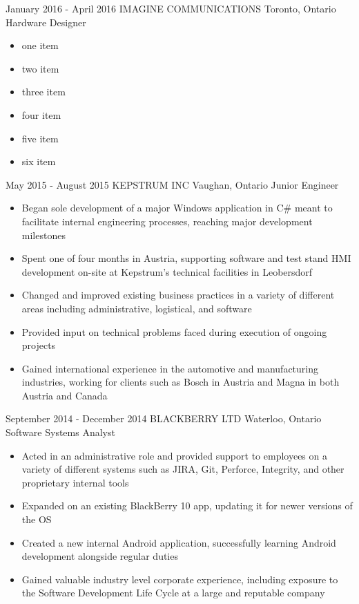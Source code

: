 \documentclass[hidelinks]{kkurucz-cv}
\begin{document}
\begin{entrylist}
\entry
{January 2016 - April 2016}
{IMAGINE COMMUNICATIONS}
{Toronto, Ontario}
{Hardware Designer}
{
\begin{itemize}
	\item one item
	\item two item
	\item three item
	\item four item
	\item five item
	\item six item
\end{itemize}
}

\entry
{May 2015 - August 2015}
{KEPSTRUM INC}
{Vaughan, Ontario}
{Junior Engineer}
{
\begin{itemize}
	\item Began sole development of a major Windows application in C\# meant to facilitate internal engineering processes, reaching major development milestones 
	\item Spent one of four months in Austria, supporting software and test stand HMI development on-site at Kepstrum’s technical facilities in Leobersdorf
	\item Changed and improved existing business practices in a variety of different areas including administrative, logistical, and software
	\item Provided input on technical problems faced during execution of ongoing projects
	\item Gained international experience in the automotive and manufacturing industries, working for clients such as Bosch in Austria and Magna in both Austria and Canada
\end{itemize}
}

\entry
{September 2014 - December 2014}
{BLACKBERRY LTD}
{Waterloo, Ontario}
{Software Systems Analyst}
{
\begin{itemize}
	\item Acted in an administrative role and provided support to employees on a variety of different systems such as JIRA, Git, Perforce, Integrity, and other proprietary internal tools
	\item Expanded on an existing BlackBerry 10 app, updating it for newer versions of the OS
	\item Created a new internal Android application, successfully learning Android development alongside regular duties
	\item Gained valuable industry level corporate experience, including exposure to the Software Development Life Cycle at a large and reputable company
\end{itemize}
}


\end{entrylist}
\end{document}
